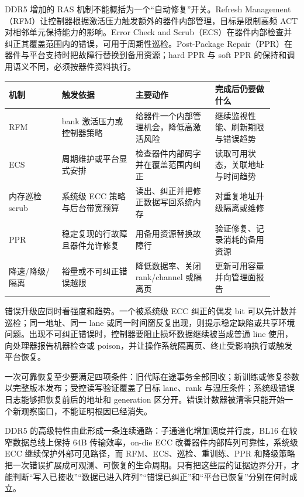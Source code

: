 DDR5 增加的 RAS 机制不能概括为一个“自动修复”开关。Refresh Management（RFM）让控制器根据激活压力触发额外的器件内部管理，目标是限制高频 ACT 对相邻单元保持能力的影响。Error Check and Scrub（ECS）在器件内部检查并纠正其覆盖范围内的错误，可用于周期性巡检。Post-Package Repair（PPR）在器件与平台支持时把故障行替换到备用资源；hard PPR 与 soft PPR 的保持和调用语义不同，必须按器件资料执行。\cite{micron-ddr5}

\begin{longtable}{L{0.18\linewidth}L{0.25\linewidth}L{0.27\linewidth}L{0.20\linewidth}}
\toprule
机制 & 触发依据 & 主要动作 & 完成后仍要做什么 \\
\midrule
RFM & bank 激活压力或控制器策略 & 给器件一个内部管理机会，降低高激活风险 & 继续监视性能、刷新期限与错误趋势 \\\tablerowrule
ECS & 周期维护或平台显式安排 & 检查器件内部码字并在覆盖范围内纠正 & 读取可用状态，关联地址与时间趋势 \\\tablerowrule
内存巡检 scrub & 系统级 ECC 策略与后台带宽预算 & 读出、纠正并把修正数据写回系统内存 & 对重复地址升级隔离或维修 \\\tablerowrule
PPR & 稳定复现的行故障且器件允许修复 & 用备用资源替换故障行 & 验证修复、记录消耗的备用资源 \\\tablerowrule
降速/降级/隔离 & 裕量或不可纠正错误越限 & 降低数据率、关闭 rank/channel 或隔离页 & 更新可用容量并向管理面报告 \\
\bottomrule
\end{longtable}

错误升级应同时看强度和趋势。一个被系统级 ECC 纠正的偶发 bit 可以先计数并巡检；同一地址、同一 lane 或同一时间窗反复出现，则提示稳定缺陷或共享环境问题。出现不可纠正错误时，控制器要阻止损坏数据继续被当成普通 line 使用，向处理器报告机器检查或 poison，并让操作系统隔离页、终止受影响执行或触发平台恢复。


一次可靠恢复至少要满足四项条件：旧代际在途事务全部回收；新训练或修复参数以完整版本发布；受控读写验证覆盖了目标 lane、rank 与温压条件；系统级错误日志能够把恢复前后的地址和 generation 区分开。错误计数器被清零只能开始一个新观察窗口，不能证明根因已经消失。

DDR5 的高级特性由此形成一条连续通路：子通道化增加调度并行度，BL16 在较窄数据总线上保持 64B 传输效率，on-die ECC 改善器件内部阵列可靠性，系统级 ECC 继续保护外部可见路径，而 RFM、ECS、巡检、重训练、PPR 和降级策略把一次错误扩展成可观测、可恢复的生命周期。只有把这些层的证据边界分开，才能判断“写入已接收”“数据已进入阵列”“错误已纠正”和“平台已恢复”分别在何时成立。
